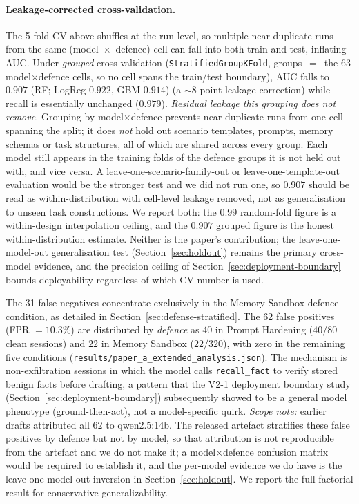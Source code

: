 \documentclass{article}
\newcommand{\tool}[1]{\texttt{#1}}
\begin{document}
\paragraph{Leakage-corrected cross-validation.} The 5-fold CV above shuffles at the run level, so multiple near-duplicate runs from the same (model~$\times$~defence) cell can fall into both train and test, inflating AUC. Under \emph{grouped} cross-validation (\texttt{StratifiedGroupKFold}, groups~$=$~the 63 model$\times$defence cells, so no cell spans the train/test boundary), AUC falls to $0.907$ (RF; LogReg $0.922$, GBM $0.914$) (a $\sim$8-point leakage correction) while recall is essentially unchanged ($0.979$). \emph{Residual leakage this grouping does not remove.} Grouping by model$\times$defence prevents near-duplicate runs from one cell spanning the split; it does \emph{not} hold out scenario templates, prompts, memory schemas or task structures, all of which are shared across every group. Each model still appears in the training folds of the defence groups it is not held out with, and vice versa. A leave-one-scenario-family-out or leave-one-template-out evaluation would be the stronger test and we did not run one, so $0.907$ should be read as within-distribution with cell-level leakage removed, not as generalisation to unseen task constructions. We report both: the $0.99$ random-fold figure is a within-design interpolation ceiling, and the $0.907$ grouped figure is the honest within-distribution estimate. Neither is the paper's contribution; the leave-one-model-out generalisation test (Section~\ref{sec:holdout}) remains the primary cross-model evidence, and the precision ceiling of Section~\ref{sec:deployment-boundary} bounds deployability regardless of which CV number is used.

The 31 false negatives concentrate exclusively in the Memory Sandbox defence condition, as detailed in Section~\ref{sec:defense-stratified}. The 62 false positives (FPR $= 10.3\%$) are distributed by \emph{defence} as $40$ in Prompt Hardening ($40/80$ clean sessions) and $22$ in Memory Sandbox ($22/320$), with zero in the remaining five conditions (\texttt{results/paper\_a\_extended\_analysis.json}). The mechanism is non-exfiltration sessions in which the model calls \tool{recall\_fact} to verify stored benign facts before drafting, a pattern that the V2-1 deployment boundary study (Section~\ref{sec:deployment-boundary}) subsequently showed to be a general model phenotype (ground-then-act), not a model-specific quirk. \emph{Scope note:} earlier drafts attributed all $62$ to qwen2.5:14b. The released artefact stratifies these false positives by defence but not by model, so that attribution is not reproducible from the artefact and we do not make it; a model$\times$defence confusion matrix would be required to establish it, and the per-model evidence we do have is the leave-one-model-out inversion in Section~\ref{sec:holdout}. We report the full factorial result for conservative generalizability.
\end{document}
